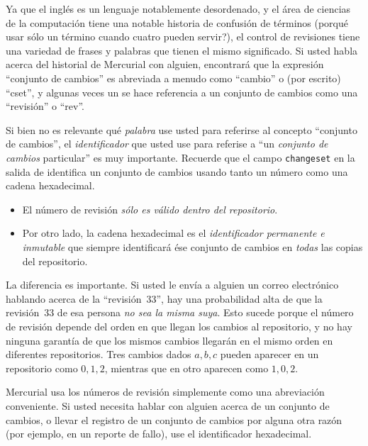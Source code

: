Ya que el inglés es un lenguaje notablemente desordenado, y el área de
ciencias de la computación tiene una notable historia de confusión de
términos (porqué usar sólo un término cuando cuatro pueden servir?),
el control de revisiones tiene una variedad de frases y palabras que
tienen el mismo significado. Si usted habla acerca del historial de
Mercurial con alguien, encontrará que la expresión ``conjunto de
cambios'' es abreviada a menudo como ``cambio'' o (por escrito)
``cset'',
y algunas veces un se hace referencia a un conjunto de cambios como
una ``revisión'' o ``rev''.

Si bien no es relevante qué \emph{palabra} use usted para referirse al
concepto ``conjunto de cambios'', el \emph{identificador} que usted
use para referise a ``un \emph{conjunto de cambios} particular'' es
muy importante. Recuerde que el campo \texttt{changeset} en la salida
de  identifica un conjunto de cambios usando tanto un
número como una cadena hexadecimal.

\begin{itemize}
    \item El número de revisión \emph{sólo es válido dentro del
        repositorio}.
    \item Por otro lado, la cadena hexadecimal es el
        \emph{identificador permanente e inmutable} que siempre
        identificará ése conjunto de cambios en \emph{todas} las
        copias del repositorio.
\end{itemize}
La diferencia es importante. Si usted le envía a alguien un correo
electrónico hablando acerca de la ``revisión~33'', hay una
probabilidad alta de que la revisión~33 de esa persona \emph{no sea la
misma suya}. Esto sucede porque el número de revisión depende del
orden en que llegan los cambios al repositorio, y no hay ninguna
garantía de que los mismos cambios llegarán en el mismo orden en
diferentes repositorios. Tres cambios dados $a,b,c$ pueden aparecer en
un repositorio como $0,1,2$, mientras que en otro aparecen como
$1,0,2$.

Mercurial usa los números de revisión simplemente como una abreviación
conveniente. Si usted necesita hablar con alguien acerca de un
conjunto de cambios, o llevar el registro de un conjunto de cambios
por alguna otra razón (por ejemplo, en un reporte de fallo), use el
identificador hexadecimal.

